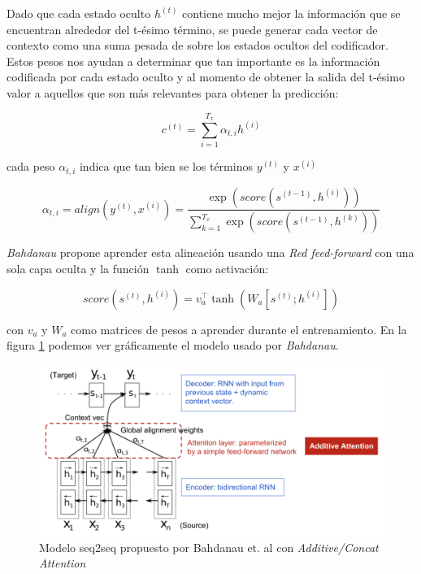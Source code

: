 Dado que cada estado oculto $h^{(t)}$ contiene mucho mejor la información que se encuentran alrededor
del t-ésimo término, se puede generar cada vector de contexto como una suma pesada de sobre los
estados ocultos del codificador. Estos pesos nos ayudan a determinar que tan importante es la
información codificada por cada estado oculto y al momento de obtener la salida del t-ésimo valor
 a aquellos que son más relevantes para obtener la predicción:

\begin{equation}
    c^{(t)} = \sum_{i=1}^{T_x} \alpha_{t,i} h^{(i)}
\end{equation}

cada peso $\alpha_{t,i}$ indica que tan bien se  los términos $y^{(t)}$ y $x^{(i)}$

\begin{equation}
    \alpha_{t,i} = align(y^{(t)}, x^{(i)}) = \frac{\exp(score(s^{(t-1)}, h^{(i)}))}{\sum_{k=1}^{T_x} \exp(score(s^{(t-1)}, h^{(k)}))}
\end{equation}

\textit{Bahdanau} propone aprender esta alineación usando una \textit{Red feed-forward} con una sola
capa oculta y la función $\tanh$ como activación:

\begin{equation}
    score(s^{(t)}, h^{(i)}) = v^\top_a \tanh(W_a[s^{(t)};h^{(i)}])
\end{equation}

con $v_a$ y $W_a$ como matrices de pesos a aprender durante el entrenamiento. En la figura \ref{fig:att}
podemos ver gráficamente el modelo usado por \textit{Bahdanau}.

\begin{figure}[ht!]
    \centering
    \includegraphics[width=0.8 \textwidth]{Chapters/1. Transformer/Figures/rnn/attention.png}
    \caption{Modelo seq2seq propuesto por Bahdanau et. al \cite{bahdanau2016neural} con \textit{Additive/Concat Attention}}
    \label{fig:att}
\end{figure}


